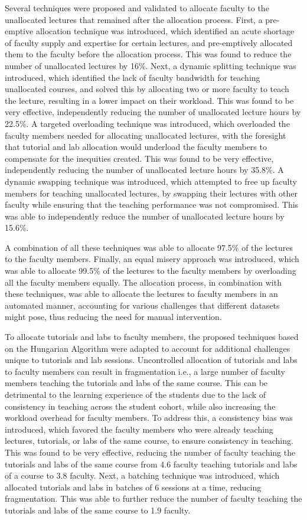 Several techniques were proposed and validated to allocate faculty to the unallocated lectures that remained after the allocation process. First, a pre-emptive allocation technique was introduced, which identified an acute shortage of faculty supply and expertise for certain lectures, and pre-emptively allocated them to the faculty before the allocation process. This was found to reduce the number of unallocated lectures by 16\%. Next, a dynamic splitting technique was introduced, which identified the lack of faculty bandwidth for teaching unallocated courses, and solved this by allocating two or more faculty to teach the lecture, resulting in a lower impact on their workload. This was found to be very effective, independently reducing the number of unallocated lecture hours by 22.5\%.  A targeted overloading technique was introduced, which overloaded the faculty members needed for allocating unallocated lectures, with the foresight that tutorial and lab allocation would underload the faculty members to compensate for the inequities created. This was found to be very effective, independently reducing the number of unallocated lecture hours by 35.8\%. A dynamic swapping technique was introduced, which attempted to free up faculty members for teaching unallocated lectures, by swapping their lectures with other faculty while ensuring that the teaching performance was not compromised. This was able to independently reduce the number of unallocated lecture hours by 15.6\%.

A combination of all these techniques was able to allocate 97.5\% of the lectures to the faculty members. Finally, an equal misery approach was introduced, which was able to allocate 99.5\% of the lectures to the faculty members by overloading all the faculty members equally. The allocation process, in combination with these techniques, was able to allocate the lectures to faculty members in an automated manner, accounting for various challenges that different datasets might pose, thus reducing the need for manual intervention.

To allocate tutorials and labs to faculty members, the proposed techniques based on the Hungarian Algorithm were adapted to account for additional challenges unique to tutorials and lab sessions. Uncontrolled allocation of tutorials and labs to faculty members can result in fragmentation i.e., a large number of faculty members teaching the tutorials and labs of the same course. This can be detrimental to the learning experience of the students due to the lack of consistency in teaching across the student cohort, while also increasing the workload overhead for faculty members. To address this, a consistency bias was introduced, which favored the faculty members who were already teaching lectures, tutorials, or labs of the same course, to ensure consistency in teaching. This was found to be very effective, reducing the number of faculty teaching the tutorials and labs of the same course from 4.6 faculty teaching tutorials and labs of a course to 3.8 faculty. Next, a batching technique was introduced, which allocated tutorials and labs in batches of 6 sessions at a time, reducing fragmentation. This was able to further reduce the number of faculty teaching the tutorials and labs of the same course to 1.9 faculty.

